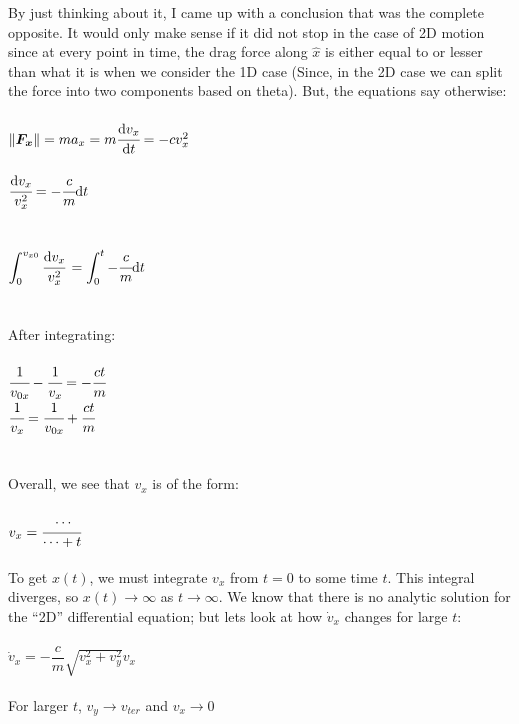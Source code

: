 \documentclass[11pt]{article}
\begin{document}
\begin{enumerate}
  By just thinking about it, I came up with a conclusion that was the complete opposite. It would only make sense if it did not stop in the case of 2D motion since at every point in time, the drag force along $\hat{x}$ is either equal to or lesser than what it is when we consider the 1D case (Since, in the 2D case we can split the force into two components based on theta). But, the equations say otherwise: \\
     \\
    $\left\lVert \boldsymbol{F_x} \right\rVert = ma_x = m\cfrac{\mathrm{d} v_x}{\mathrm{d} t} = -cv_x^2$ \\
     \\
    $\cfrac{\mathrm{d} v_x}{v_x^2} = -\cfrac{c}{m}\mathrm{d}t$ \\
     \\
     \\
    $\displaystyle\int_{0}^{v_{x0}}  \cfrac{\mathrm{d} v_x}{v_x^2}\, = \displaystyle\int_{0}^{t}-\cfrac{c}{m}\mathrm{d}t$ \\
     \\
     \\
     After integrating:
     \\
     \\
    $\cfrac{1}{v_{0x}} - \cfrac{1}{v_{x}}= -\cfrac{ct}{m}$
     \\
    $\cfrac{1}{v_{x}}= \cfrac{1}{v_{0x}} + \cfrac{ct}{m}$ 
     \\
     \\
     \\
    Overall, we see that $v_x$ is of the form:
     \\
     \\
    $v_x = \cfrac{\cdots}{\cdots + t} $
     \\
     \\
    To get $x(t)$, we must integrate $v_x$ from $t = 0$ to some time $t$. This integral diverges, so $x(t)\longrightarrow \infty$ as $t\longrightarrow \infty$.  
    We know that there is no analytic solution for the ``2D'' differential equation; but lets look at how $\dot{v}_x$ changes for large $t$:
     \\
     \\
    $\dot{v}_x = -\dfrac{c}{m} \sqrt{v_x^2+v_y^2} v_x$
     \\
     \\
    For larger $t$, $v_y \longrightarrow v_{ter}$ and $v_x \longrightarrow 0$
     \\

\end{enumerate}
\end{document}
